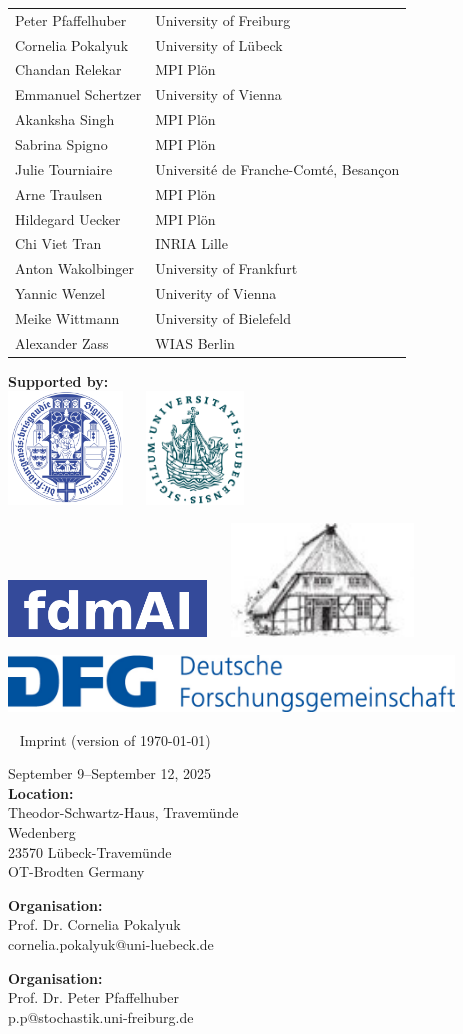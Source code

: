 \documentclass[12pt,a4paper]{article}
\makeatletter
\newcommand{\Impressum}{%
{\scriptsize
\fboxsep0pt
{\begin{minipage}[b]{.4\textwidth}
September 9--September 12, 2025\\[.5ex]
\textbf{Location: }\\
Theodor-Schwartz-Haus, Travemünde\\
Wedenberg \\
23570 Lübeck-Travemünde \\ OT-Brodten
Germany
\end{minipage}}
\hfill
{\begin{minipage}[b]{.29\textwidth}
\textbf{Organisation: }\\
Prof. Dr. Cornelia Pokalyuk \\
cornelia.pokalyuk@uni-luebeck.de  
\end{minipage}}%
\hfill
{\begin{minipage}[b]{.29\textwidth}
\textbf{Organisation: }\\
Prof. Dr. Peter Pfaffelhuber\\
p.p@stochastik.uni-freiburg.de
\end{minipage}} 
}}
\makeatother
\begin{document}
\begin{longtable}{L{0.3\textwidth}R{0.7\textwidth}}
Peter Pfaffelhuber & University of Freiburg \\
Cornelia Pokalyuk & University of Lübeck \\
Chandan Relekar & MPI Plön \\
Emmanuel Schertzer & University of Vienna \\
Akanksha Singh & MPI Plön \\
Sabrina Spigno & MPI Plön \\
Julie Tourniaire & Université de Franche-Comté, Besançon \\
Arne Traulsen & MPI Plön \\
Hildegard Uecker & MPI Plön \\
Chi Viet Tran & INRIA Lille \\
Anton Wakolbinger & University of Frankfurt \\
Yannic Wenzel & Univerity of Vienna \\
Meike Wittmann & University of Bielefeld \\
Alexander Zass & WIAS Berlin \\
\end{longtable}


\newpage


\textbf{Supported by: }\\
 
\includegraphics[height=3cm]{UFR-vorlage-designsystem-typo-farben-V1.99-768x543.png}
~\hfill ~
\includegraphics[height=3cm]{Siegel-Uni-Luebeck.svg.png}
~\hfill ~

\bigskip
\includegraphics[height=1.5cm]{fdmai.png}
~\hfill ~
\includegraphics[height=3cm]{logo-tsh.jpg}
~\hfill ~

\bigskip
\bigskip
\bigskip
\bigskip

\includegraphics[height=1.5cm]{dfg.jpg}

 ~
 \vfill
 {\scriptsize Imprint {\tiny (version of \today) }} \\[1ex]
 \Impressum
 
 \bigskip
\end{document}
